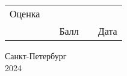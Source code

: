 \begin{titlepage}
    \vspace{1.5cm}
    \begin{tabular}{lcccc}
        \multirow{1}{2cm}{Оценка} & \hspace{3cm} & \underline{\hspace{3cm}} & \hspace{1cm} & \underline{\hspace{5cm}}\\
        \hspace{1cm} && \footnotesize{Балл} && \footnotesize{Дата} \\
    \end{tabular}

    \vspace{\fill}

    \begin{center}
    Санкт-Петербург\\ 2024
    \end{center}

\end{titlepage}
